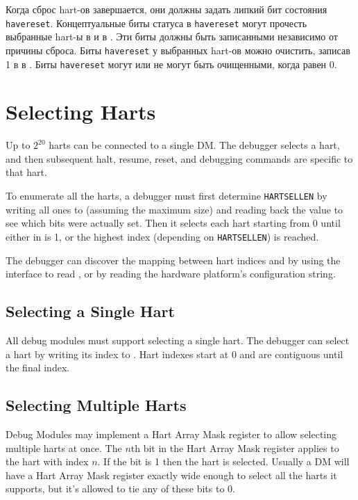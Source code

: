 Когда сброс hart-ов завершается, они должны задать липкий бит состояния {\tt havereset}.
Концептуальные биты статуса в {\tt havereset} могут прочесть выбранные hart-ы в
\FdmDmstatusAnyhavereset и \FdmDmstatusAllhavereset в \RdmDmstatus.
Эти биты должны быть записанными независимо от причины сброса.
Биты {\tt havereset} у выбранных hart-ов
можно очистить, записав 1 в \FdmDmcontrolAckhavereset в \RdmDmcontrol.
Биты {\tt havereset} могут или не могут быть очищенными,
когда \FdmDmcontrolDmactive равен 0.

\section{Selecting Harts} \label{selectingharts}

Up to $2^{20}$ harts can be connected to a single DM. The debugger
selects a hart, and then subsequent halt, resume, reset, and debugging
commands are specific to that hart.

To enumerate all the harts, a debugger must first determine {\tt HARTSELLEN}
by writing  all ones to \Fhartsel (assuming the maximum size) and reading back
the value to see which bits were actually set.  Then it selects each hart
starting from 0 until either \FdmDmstatusAnynonexistent in \RdmDmstatus is 1, or the
highest index (depending on {\tt HARTSELLEN}) is reached.

The debugger can discover the mapping between hart indices and
\Rmhartid by using the interface to read \Rmhartid, or by
reading the hardware platform's configuration string.

\subsection {Selecting a Single Hart}

All debug modules must support selecting a single hart.
The debugger can select a hart by writing its index to \Fhartsel.
Hart indexes start at 0 and are contiguous until the final index.

\subsection {Selecting Multiple Harts} \label{hartarraymask}

Debug Modules may implement a Hart Array Mask register to allow selecting
multiple harts at once. The $n$th bit in the Hart Array Mask register applies to
the hart with index $n$. If the bit is 1 then the hart is selected.  Usually a DM
will have a Hart Array Mask register exactly wide enough to select all the
harts it supports, but it's allowed to tie any of these bits to 0.

